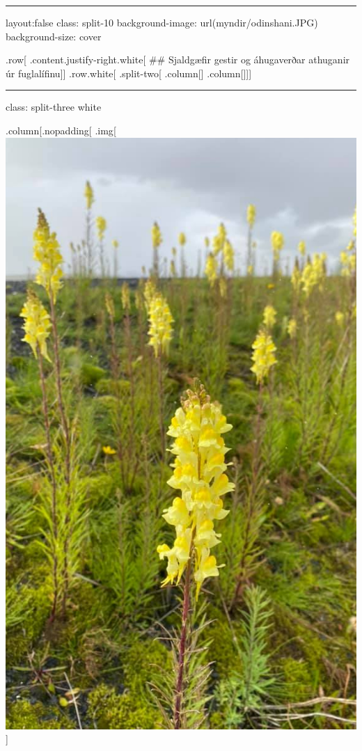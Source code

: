 \documentclass[
]{article}
\begin{document}
\begin{center}\rule{0.5\linewidth}{0.5pt}\end{center}

layout:false class: split-10 background-image: url(myndir/odinshani.JPG)
background-size: cover

.row{[} .content.justify-right.white{[} \#\# Sjaldgæfir gestir og
áhugaverðar athuganir úr fuglalífinu{]}{]} .row.white{[} .split-two{[}
.column{[}{]} .column{[}{]}{]}{]}

\begin{center}\rule{0.5\linewidth}{0.5pt}\end{center}

class: split-three white

.column{[}.nopadding{[}
.img{[}\includegraphics{myndir/breyttar/gullspora.png}{]}
\end{document}
